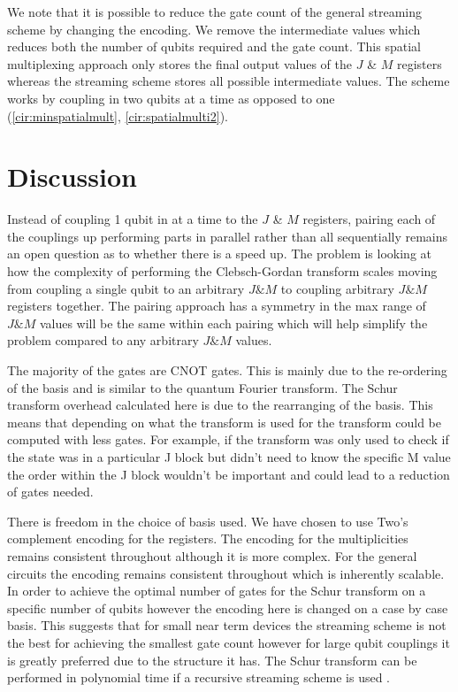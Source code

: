\documentclass[12pt]{article}
\begin{document}
We note that it is possible to reduce the gate count of the general streaming scheme by changing the encoding. We remove the intermediate values which reduces both the number of qubits required and the gate count. This spatial multiplexing approach only stores the final output values of the $J$ \& $M$ registers whereas the streaming scheme stores all possible intermediate values. The scheme works by coupling in two qubits at a time as opposed to one (\autoref{cir:minspatialmult}, \autoref{cir:spatialmulti2}). 

\section{Discussion}

Instead of coupling 1 qubit in at a time to the $J$ \& $M$ registers, pairing each of the couplings up performing parts in parallel rather than all sequentially remains an open question as to whether there is a speed up. The problem is looking at how the complexity of performing the Clebsch-Gordan transform scales moving from coupling a single qubit to an arbitrary $J \& M$ to coupling arbitrary $J \& M$ registers together. The pairing approach has a symmetry in the max range of $J \& M$ values will be the same within each pairing which will help simplify the problem compared to any arbitrary $J \& M$ values.

The majority of the gates are CNOT gates. This is mainly due to the re-ordering of the basis and is similar to the quantum Fourier transform. The Schur transform overhead calculated here is due to the rearranging of the basis. This means that depending on what the transform is used for the transform could be computed with less gates. For example, if the transform was only used to check if the state was in a particular J block but didn't need to know the specific M value the order within the J block wouldn't be important and could lead to a reduction of gates needed.

There is freedom in the choice of basis used. We have chosen to use Two's complement encoding for the registers. The encoding for the multiplicities remains consistent throughout although it is more complex. For the general circuits the encoding remains consistent throughout which is inherently scalable. In order to achieve the optimal number of gates for the Schur transform on a specific number of qubits however the encoding here is changed on a case by case basis. This suggests that for small near term devices the streaming scheme is not the best for achieving the smallest gate count however for large qubit couplings it is greatly preferred due to the structure it has. The Schur transform can be performed in polynomial time if a recursive streaming scheme is used \cite{bacon2007quantum}. 
\end{document}
